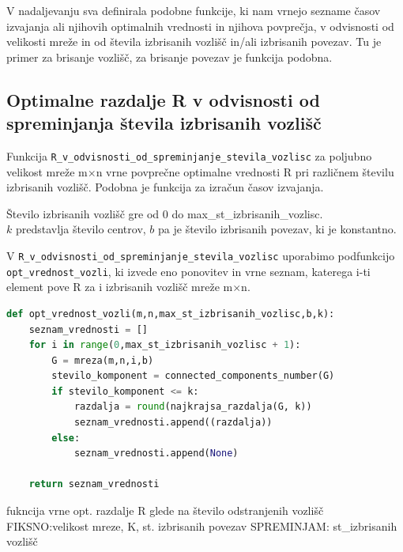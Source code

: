 \documentclass[a4paper]{article}
\begin{document}

V nadaljevanju sva definirala podobne funkcije, ki nam vrnejo sezname časov izvajanja ali njihovih optimalnih vrednosti in njihova povprečja, v odvisnosti od velikosti mreže in od števila izbrisanih vozlišč in/ali izbrisanih povezav. Tu je primer za brisanje vozlišč, za brisanje povezav je funkcija podobna.


\subsection{Optimalne razdalje R v odvisnosti od spreminjanja števila izbrisanih vozlišč}
Funkcija  \texttt{R\_v\_odvisnosti\_od\_spreminjanje\_stevila\_vozlisc} za poljubno velikost mreže m$\times$n vrne povprečne optimalne vrednosti R pri različnem številu izbrisanih vozlišč. Podobna je funkcija za izračun časov izvajanja.
\par
Število izbrisanih vozlišč gre od 0 do max\_st\_izbrisanih\_vozlisc.\\
$k$ predstavlja število centrov, $b$ pa je število izbrisanih povezav, ki je konstantno.

\vspace{\baselineskip}
V \texttt{R\_v\_odvisnosti\_od\_spreminjanje\_stevila\_vozlisc} uporabimo podfunkcijo \texttt{opt\_vrednost\_vozli}, ki izvede eno ponovitev in vrne seznam, katerega i-ti element pove R za i izbrisanih vozlišč mreže m$\times$n.
\begin{lstlisting}[language=Python]
def opt_vrednost_vozli(m,n,max_st_izbrisanih_vozlisc,b,k):
    seznam_vrednosti = []
    for i in range(0,max_st_izbrisanih_vozlisc + 1):
        G = mreza(m,n,i,b)
        stevilo_komponent = connected_components_number(G)
        if stevilo_komponent <= k:
            razdalja = round(najkrajsa_razdalja(G, k))
            seznam_vrednosti.append((razdalja))
        else:
            seznam_vrednosti.append(None)
            
    return seznam_vrednosti
\end{lstlisting}

fukncija vrne opt. razdalje R glede na število odstranjenih vozlišč
FIKSNO:velikost mreze, K, st. izbrisanih povezav
SPREMINJAM: st\_izbrisanih vozlišč
\end{document}

